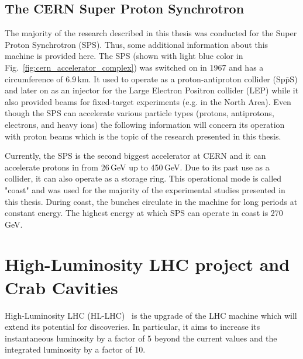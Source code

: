  \subsection{The CERN Super Proton Synchrotron}
 The majority of the research described in this thesis was conducted for the Super Proton Synchrotron (SPS). Thus, some additional information about this machine is provided here. The SPS (shown with light blue color in Fig.~\ref{fig:cern_accelerator_complex}) was switched on in 1967 and has a circumference of 6.9\,km. It used to operate as a proton-antiproton collider ($\mathrm{Sp\bar{p}S}$) and later on as an injector for the Large Electron Positron collider (LEP) while it also provided beams for fixed-target experiments (e.g. in the North Area). Even though the SPS can accelerate various particle types (protons, antiprotons, electrons, and heavy ions) the following information will concern its operation with proton beams which is the topic of the research presented in this thesis.

 Currently, the SPS is the second biggest accelerator at CERN and it can accelerate protons in from 26\,GeV up to 450\,GeV. Due to its past use as a collider, it can also operate as a storage ring. This operational mode is called "coast" and was used for the majority of the experimental studies presented in this thesis. During coast, the bunches circulate in the machine for long periods at constant energy. The highest energy at which SPS can operate in coast is 270\,GeV. 

 



\section{High-Luminosity LHC project and Crab Cavities}

High-Luminosity LHC (HL-LHC)~\cite{HL_LHC_yellow_report, Brning2015} is the upgrade of the LHC machine which will extend its potential for discoveries. In particular, it aims to increase its instantaneous luminosity by a factor of 5 beyond the current values and the integrated luminosity by a factor of 10. 

